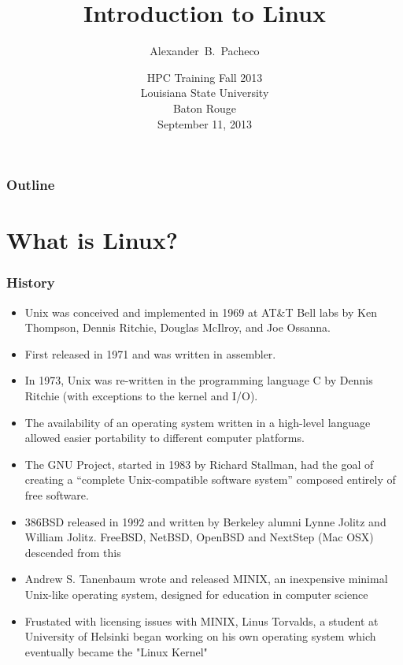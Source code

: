 \documentclass[slidestop,mathserif,compress,xcolor=svgnames]{beamer}
\title{Introduction to Linux}
\author[Alex Pacheco]{\large{Alexander~B.~Pacheco}}
\institute[HPC Training: Fall 2013] {\inst{}\footnotesize{User Services Consultant\\LSU HPC \& LONI\\sys-help@loni.org}}
\date[\hfill{Sep. 11, 2013\hspace{2cm}\insertframenumber/\inserttotalframenumber}]{\scriptsize{HPC Training Fall 2013\\Louisiana State University\\Baton Rouge\\September 11, 2013}}
\begin{document}
\frame{\titlepage}

\footnotesize

\begin{frame}[label=toc,squeeze]
  \footnotesize
  \frametitle{\small{Outline}}
  \tableofcontents
\end{frame}

\section{What is Linux?}
\begin{frame}[allowframebreaks]
  \frametitle{\small History}
  \begin{itemize}
    \item Unix was conceived and implemented in 1969 at AT\&T Bell labs by  Ken Thompson, Dennis Ritchie, Douglas McIlroy, and Joe Ossanna.
    \item First released in 1971 and was written in assembler.
    \item In 1973, Unix was re-written in the programming language C by Dennis Ritchie (with exceptions to the kernel and I/O).
    \item The availability of an operating system written in a high-level language allowed easier portability to different computer platforms.
    \item The GNU Project, started in 1983 by Richard Stallman, had the goal of creating a ``complete Unix-compatible software system'' composed entirely of free software.
    \item 386BSD released in 1992 and written by Berkeley alumni Lynne Jolitz and William Jolitz. FreeBSD, NetBSD, OpenBSD and NextStep (Mac OSX) descended from this
    \item Andrew S. Tanenbaum wrote and released MINIX, an inexpensive minimal Unix-like operating system, designed for education in computer science
%
    \item Frustated with licensing issues with MINIX, Linus Torvalds, a student at University of Helsinki began working on his own operating system which eventually became the "Linux Kernel"

\end{itemize}
\end{frame}
\end{document}
